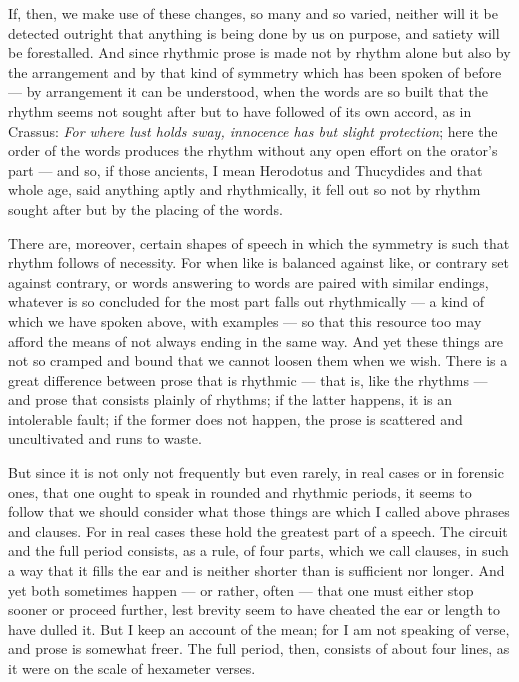  If, then, we make use of these changes, so many and so varied, neither will it be detected outright that anything is being done by us on purpose, and satiety will be forestalled. And since rhythmic prose is made not by rhythm alone but also by the arrangement and by that kind of symmetry which has been spoken of before — by arrangement it can be understood, when the words are so built that the rhythm seems not sought after but to have followed of its own accord, as in Crassus: \textit{For where lust holds sway, innocence has but slight protection}; here the order of the words produces the rhythm without any open effort on the orator's part — and so, if those ancients, I mean Herodotus and Thucydides and that whole age, said anything aptly and rhythmically, it fell out so not by rhythm sought after but by the placing of the words.

 There are, moreover, certain shapes of speech in which the symmetry is such that rhythm follows of necessity. For when like is balanced against like, or contrary set against contrary, or words answering to words are paired with similar endings, whatever is so concluded for the most part falls out rhythmically — a kind of which we have spoken above, with examples — so that this resource too may afford the means of not always ending in the same way. And yet these things are not so cramped and bound that we cannot loosen them when we wish. There is a great difference between prose that is rhythmic — that is, like the rhythms — and prose that consists plainly of rhythms; if the latter happens, it is an intolerable fault; if the former does not happen, the prose is scattered and uncultivated and runs to waste.

 But since it is not only not frequently but even rarely, in real cases or in forensic ones, that one ought to speak in rounded and rhythmic periods, it seems to follow that we should consider what those things are which I called above phrases and clauses. For in real cases these hold the greatest part of a speech. The circuit and the full period consists, as a rule, of four parts, which we call clauses, in such a way that it fills the ear and is neither shorter than is sufficient nor longer. And yet both sometimes happen — or rather, often — that one must either stop sooner or proceed further, lest brevity seem to have cheated the ear or length to have dulled it. But I keep an account of the mean; for I am not speaking of verse, and prose is somewhat freer. The full period, then, consists of about four lines, as it were on the scale of hexameter verses.

